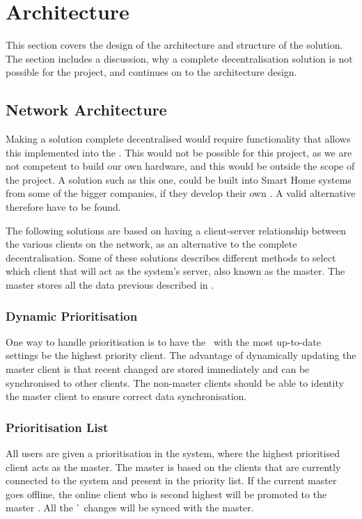 \section{Architecture}\label{sec:architecture}
This section covers the design of the architecture and structure of the solution. The section includes a discussion, why a complete decentralisation solution is not possible for the project, and continues on to the architecture design.


\subsection{Network Architecture}\label{sec:network-architecture}
Making a solution complete decentralised would require functionality that allows this implemented into the \sdevs. This would not be possible for this project, as we are not competent to build our own hardware, and this would be outside the scope of the project. A solution such as this one, could be built into Smart Home systems from some of the bigger companies, if they develop their own \sdevs. A valid alternative therefore have to be found.

The following solutions are based on having a client-server relationship between the various clients on the network, as an alternative to the complete decentralisation. Some of these solutions describes different methods to select which client that will act as the system's server, also known as the master. The master stores all the data previous described in .

\subsubsection{Dynamic Prioritisation}
One way to handle prioritisation is to have the \phone~with the most up-to-date settings be the highest priority client. The advantage of dynamically updating the master client is that recent changed are stored immediately and can be synchronised to other clients. The non-master clients should be able to identity the master client to ensure correct data synchronisation.

\subsubsection{Prioritisation List}
All users are given a prioritisation in the system, where the highest prioritised client acts as the master. The master is based on the clients that are currently connected to the system and present in the priority list. If the current master goes offline, the online client who is second highest will be promoted to the master \phone. All the \phones'~changes will be synced with the master.

